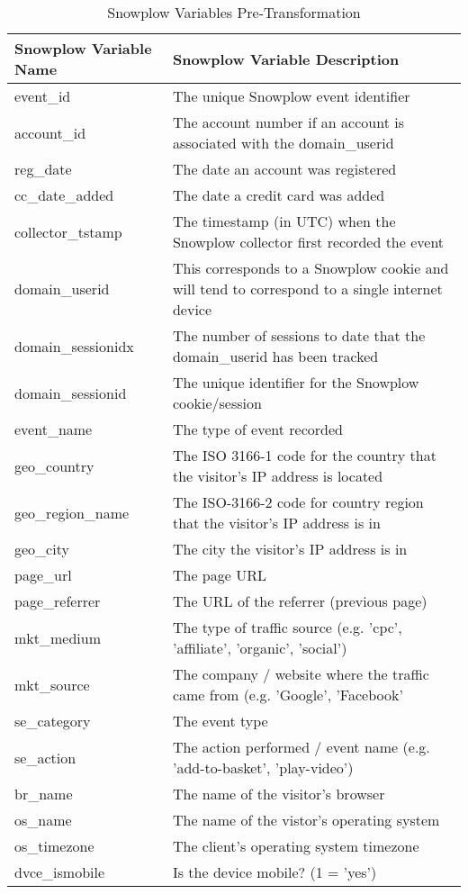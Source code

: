 \documentclass{article} %
\begin{document}
\begin{landscape}
\begin{table}[h!]
\centering
\begin{tabular}{| l | l |} 
\hline
Snowplow Variable Name  & Snowplow Variable Description  \\ [0.5ex] 
\hline\hline
event\_id   & The unique Snowplow event identifier \\
\hline
account\_id & The account number if an account is associated with the domain\_userid     \\ 
\hline
reg\_date & The date an account was registered  \\
\hline
cc\_date\_added & The date a credit card was added \\
\hline
collector\_tstamp & The timestamp (in UTC) when the Snowplow collector first recorded the event  \\
\hline
domain\_userid & This corresponds to a Snowplow cookie and will tend to correspond to a single internet device  \\ 
\hline
domain\_sessionidx & The number of sessions to date that the domain\_userid has been tracked \\
\hline
domain\_sessionid & The unique identifier for the Snowplow cookie/session \\
\hline
event\_name & The type of event recorded  \\
\hline
geo\_country & The ISO 3166-1 code for the country that the visitor's IP address is located \\
\hline
geo\_region\_name & The ISO-3166-2 code for country region that the visitor's IP address is in \\
\hline
geo\_city & The city the visitor's IP address is in  \\
\hline
page\_url & The page URL \\
\hline
page\_referrer & The URL of the referrer (previous page) \\
\hline
mkt\_medium & The type of traffic source (e.g. 'cpc', 'affiliate', 'organic', 'social')  \\
\hline
mkt\_source & The company / website where the traffic came from (e.g. 'Google', 'Facebook' \\
\hline
se\_category & The event type  \\ 
\hline                               
se\_action & The action performed / event name (e.g. 'add-to-basket', 'play-video') \\
\hline
br\_name   & The name of the visitor's browser       \\ 
\hline                               
os\_name     & The name of the vistor's operating system       \\   
\hline               
os\_timezone  & The client's operating system timezone       \\ 
\hline        
dvce\_ismobile  & Is the device mobile? (1 = 'yes')  \\
\hline
\end{tabular}
\caption{Snowplow Variables Pre-Transformation}
\label{table:1}
\end{table}
\end{landscape}
\end{document}
